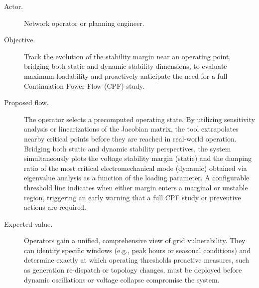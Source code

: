 
\begin{description}
  \item[Actor.] Network operator or planning engineer.
  \item[Objective.] Track the evolution of the stability margin near an operating point, bridging both static and dynamic stability dimensions, to evaluate maximum loadability and proactively anticipate the need for a full Continuation Power-Flow (CPF) study.
  \item[Proposed flow.] The operator selects a precomputed operating state. By utilizing sensitivity analysis or linearizations of the Jacobian matrix, the tool extrapolates nearby critical points before they are reached in real-world operation. Bridging both static and dynamic stability perspectives, the system simultaneously plots the voltage stability margin (static) and the damping ratio of the most critical electromechanical mode (dynamic) obtained via eigenvalue analysis as a function of the loading parameter. A configurable threshold line indicates when either margin enters a marginal or unstable region, triggering an early warning that a full CPF study or preventive actions are required.
  \item[Expected value.] Operators gain a unified, comprehensive view of grid vulnerability. They can identify specific windows (e.g., peak hours or seasonal conditions) and determine exactly at which operating thresholds proactive measures, such as generation re-dispatch or topology changes, must be deployed before dynamic oscillations or voltage collapse compromise the system.
\end{description}

